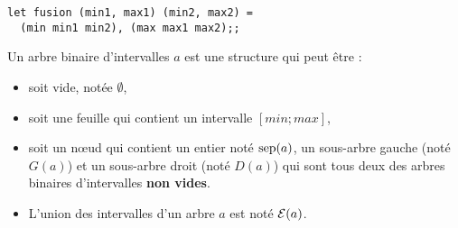 \begin{Answer}
\begin{lstlisting}
let fusion (min1, max1) (min2, max2) = 
  (min min1 min2), (max max1 max2);;
\end{lstlisting}
\end{Answer}

\medskip

Un arbre binaire d'intervalles $a$ est une structure qui peut être :
\begin{itemize}
\item soit vide, notée $\emptyset$,
\item soit une feuille qui contient un intervalle $[min; max]$,
\item soit un nœud qui contient un entier noté $\text{sep}(a)$, un sous-arbre gauche (noté $G(a)$) et un sous-arbre droit (noté $D(a)$) qui sont tous deux des arbres binaires d'intervalles {\bf non vides}.
\item L'union des intervalles d'un arbre $a$ est noté ${\cal E}(a)$.
\end{itemize}

\medskip


